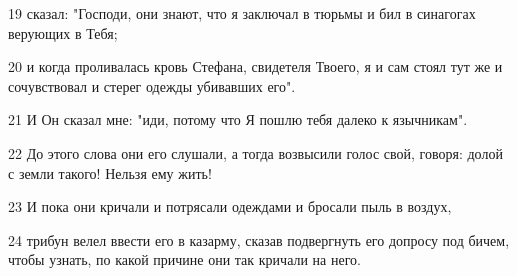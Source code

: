 19 сказал: "Господи, они знают, что я заключал в тюрьмы и бил в синагогах верующих в Тебя;

20 и когда проливалась кровь Стефана, свидетеля Твоего, я и сам стоял тут же и сочувствовал и стерег одежды убивавших его".

21 И Он сказал мне: "иди, потому что Я пошлю тебя далеко к язычникам".

22 До этого слова они его слушали, а тогда возвысили голос свой, говоря: долой с земли такого! Нельзя ему жить!

23 И пока они кричали и потрясали одеждами и бросали пыль в воздух,

24 трибун велел ввести его в казарму, сказав подвергнуть его допросу под бичем, чтобы узнать, по какой причине они так кричали на него.


